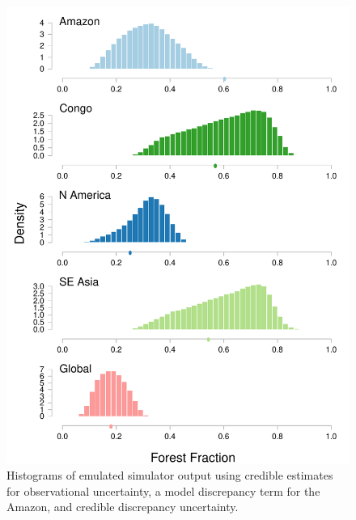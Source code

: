 \documentclass[esd, manuscript]{copernicus}
\begin{document}
\begin{figure}[t]
\includegraphics[width=12cm]{graphics/credible_NROY_hists_disc.pdf}
\caption{Histograms of emulated simulator output using credible estimates for observational uncertainty, a model discrepancy term for the Amazon, and credible discrepancy uncertainty.}
\label{fig:credible_NROY_hists_disc}
\end{figure}
\end{document}
